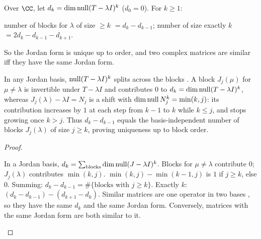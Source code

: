 \documentclass[10pt]{scrartcl}
\begin{document}
\begin{theorem*}\hypertarget{prop-77}{}\label{prop-77}
  Over $\CC$, let $d_k=\dim\operatorname{null}(T-\lambda I)^k$ ($d_0=0$). For $k\ge1$:
  \begin{itemize}
    \ii number of blocks for $\lambda$ of size $\ge k$ $=d_k-d_{k-1}$;
    \ii number of size exactly $k$ $=2d_k-d_{k-1}-d_{k+1}$.
  \end{itemize}
  So the Jordan form is unique up to order, and two complex matrices are similar iff they have the same Jordan form.
\end{theorem*}
\begin{ideabox}
In any Jordan basis, $\operatorname{null}(T-\lambda I)^k$ splits across the blocks . A block $J_j(\mu)$ for $\mu\ne\lambda$ is invertible under $T-\lambda I$ and contributes $0$ to $d_k=\dim\operatorname{null}(T-\lambda I)^k$, whereas $J_j(\lambda)-\lambda I=N_j$ is a shift with $\dim\operatorname{null} N_j^k=\min(k,j)$: its contribution increases by $1$ at each step from $k-1$ to $k$ while $k\le j$, and stops growing once $k>j$. Thus $d_k-d_{k-1}$ equals the basis-independent number of blocks $J_j(\lambda)$ of size $j\ge k$, proving uniqueness up to block order.
\end{ideabox}
\begin{proof}
  \begin{steps}
    \ii In a Jordan basis, $d_k=\sum_{\text{blocks}}\dim\operatorname{null}(J-\lambda I)^k$. Blocks for $\mu\ne\lambda$ contribute $0$; $J_j(\lambda)$ contributes $\min(k,j)$.
    \ii $\min(k,j)-\min(k-1,j)$ is $1$ if $j\ge k$, else $0$. Summing: $d_k-d_{k-1}=\#\{\text{blocks with }j\ge k\}$. Exactly $k$: $(d_k-d_{k-1})-(d_{k+1}-d_k)$.
    \ii Similar matrices are one operator in two bases , so they have the same $d_k$ and the same Jordan form. Conversely, matrices with the same Jordan form are both similar to it.
  \end{steps}
\end{proof}
\end{document}
